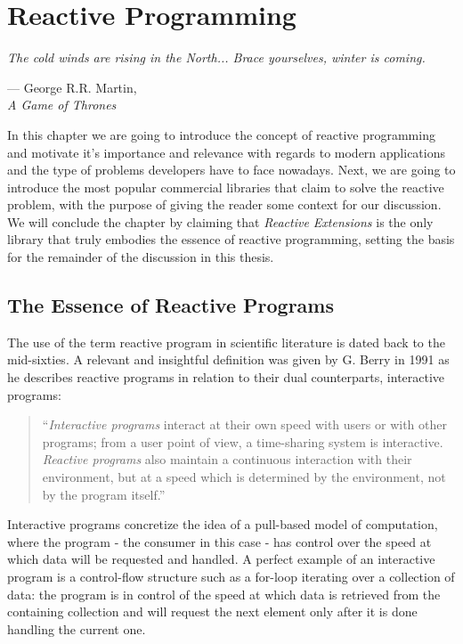 \let\textcircled=\pgftextcircled
\chapter{Reactive Programming}
\label{chap:reactiveprogramming}

\epigraph{\hspace{4ex}\textit{The cold winds are rising in the North... Brace yourselves, winter is coming.}}{--- George R.R. Martin,\\ \textit{A Game of Thrones}}


In this chapter we are going to introduce the concept of reactive programming and motivate it's importance and relevance with regards to modern applications and the type of problems developers have to face nowadays. Next, we are going to introduce the most popular commercial libraries that claim to solve the reactive problem, with the purpose of giving the reader some context for our discussion. We will conclude the chapter by claiming that \textit{Reactive Extensions} is the only library that truly embodies the essence of reactive programming, setting the basis for the remainder of the discussion in this thesis.

\section{The Essence of Reactive Programs}

The use of the term reactive program in scientific literature is dated back to the mid-sixties\cite{scopus-reactive}. A relevant and insightful definition was given by G. Berry in 1991\cite{berry1991reactive} as he describes reactive programs in relation to their dual counterparts, interactive programs:

\begin{quote}
\hspace{4ex}``\textit{Interactive programs} interact at their own speed with users or with other programs; from a user point of view, a time-sharing system is interactive. \textit{Reactive programs} also maintain a continuous interaction with their environment, but at a speed which is determined by the environment, not by the program itself.''
\end{quote}

Interactive programs concretize the idea of a pull-based model of computation, where the program - the consumer in this case - has control over the speed at which data will be requested and handled. A perfect example of an interactive program is a control-flow structure such as a for-loop iterating over a collection of data: the program is in control of the speed at which data is retrieved from the containing collection and will request the next element only after it is done handling the current one.

